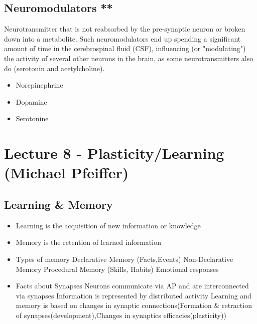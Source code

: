 \documentclass[english,11pt]{article}
\begin{document}
\subsection{Neuromodulators **}
Neurotransmitter that is not reabsorbed by the pre-synaptic neuron or broken down into a metabolite. Such neuromodulators end up spending a significant amount of time in the cerebrospinal fluid (CSF), influencing (or "modulating") the activity of several other neurons in the brain, as some neurotransmitters also do (serotonin and acetylcholine).
\begin{itemize}
\item Norepinephrine
\item Dopamine
\item Serotonine
\end{itemize}








\section{Lecture 8 - Plasticity/Learning (Michael Pfeiffer)}


\subsection{Learning \& Memory}
\begin{itemize}
\item Learning is the acquisition of new information or knowledge
\item Memory is the retention of learned information
\item Types of memory
\subitem Declarative Memory (Facts,Events)
\subitem Non-Declarative Memory
\subitem Procedural Memory (Skills, Habits)
\subitem Emotional responses
\item Facts about Synapses
\subitem Neurons communicate via AP and are interconnected via synapses
\subitem Information is represented by distributed activity
\subitem Learning and memory is based on changes in synaptic connections(Formation \& retraction of synapses(development),Changes in synaptics efficacies(plasticity))    
\end{itemize}
\end{document}
